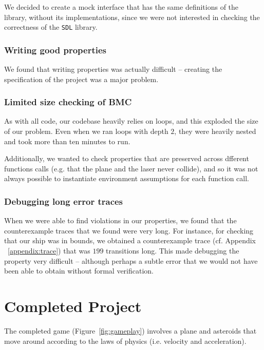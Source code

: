 \documentclass{article}
\begin{document}
We decided to create a mock interface that has the same definitions of the library, without its implementations,
since we were not interested in checking the correctness of the \texttt{SDL} library.

\subsubsection{Writing good properties}
We found that writing properties was actually difficult -- creating the specification of the project was a major problem.


\subsubsection{Limited size checking of BMC}
As with all code, our codebase heavily relies on loops, and this exploded the size of our problem.
Even when we ran loops with depth $2$, they were heavily nested and took more than ten minutes to run.

Additionally, we wanted to check properties that are preserved across dfferent functions calls (e.g. that the plane and the laser never collide), and so it was not always possible to instantiate environment assumptions for each function call.

\subsubsection{Debugging long error traces}
When we were able to find violations in our properties, we found that the counterexample traces that we found were very long.
For instance, for checking that our ship was in bounds, we obtained a counterexample trace (cf. Appendix ~\ref{appendix:trace}) that was $199$ transitions long.
This made debugging the property very difficult -- although perhaps a subtle error that we would not have been able to obtain without formal verification.

\section{Completed Project}
The completed game (Figure~\ref{fig:gameplay}) involves a plane and asteroids that move around according to the laws of physics (i.e. velocity and acceleration).
\end{document}
